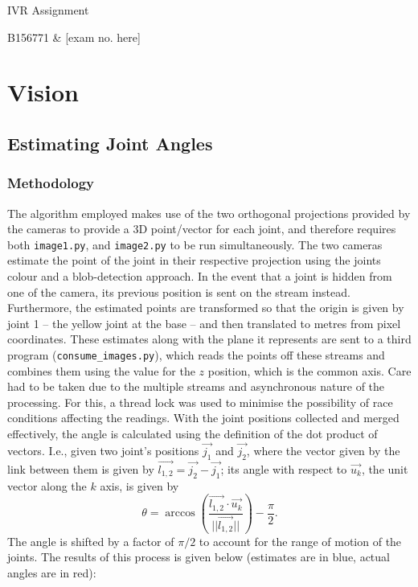 \documentclass[11pt]{article}
\begin{document}
\begin{center}
    IVR Assignment

    B156771 \& [exam no. here]
\end{center}
\section{Vision}
\subsection{Estimating Joint Angles}
\subsubsection{Methodology}
The algorithm employed makes use of the two orthogonal projections provided by the cameras to provide a 3D point/vector for each joint, and therefore requires both \texttt{image1.py}, and \texttt{image2.py} to be run simultaneously.
The two cameras estimate the point of the joint in their respective projection using the joints colour and a blob-detection approach.
In the event that a joint is hidden from one of the camera, its previous position is sent on the stream instead.
Furthermore, the estimated points are transformed so that the origin is given by joint 1 -- the yellow joint at the base -- and then translated to metres from pixel coordinates. 
These estimates along with the plane it represents are sent to a third program (\texttt{consume\_images.py}), which reads the points off these streams and combines them using the value for the $z$ position, which is the common axis. 
Care had to be taken due to the multiple streams and asynchronous nature of the processing. 
For this, a thread lock was used to minimise the possibility of race conditions affecting the readings. 
With the joint positions collected and merged effectively, the angle is calculated using the definition of the dot product of vectors.
I.e., given two joint's positions $\vec{j_1}$ and $\vec{j_2}$, where the vector given by the link between them is given by $\vec{l_{1,2}} = \vec{j_2} - \vec{j_1}$; its angle with respect to $\vec{u_k}$, the unit vector along the $k$ axis, is given by $$ \theta = \arccos\left(\frac{\vec{l_{1,2}}\cdot \vec{u_k}}{||\vec{l_{1,2}}||}\right) - \frac{\pi}{2}.$$
The angle is shifted by a factor of $\pi/2$ to account for the range of motion of the joints.
The results of this process is given below (estimates are in blue, actual angles are in red):
\end{document}
